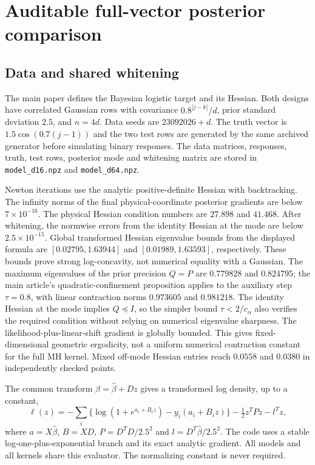 \documentclass[11pt]{article}
\theoremstyle{definition}\newtheorem{definition}[theorem]{Definition}
\theoremstyle{remark}\newtheorem{remark}[theorem]{Remark}
\numberwithin{equation}{section}
\newcommand{\1}{\mathbf 1}
\begin{document}
\section{Auditable full-vector posterior comparison}
\subsection{Data and shared whitening}
The main paper defines the Bayesian logistic target and its Hessian. Both designs have correlated Gaussian rows with covariance $0.8^{|j-k|}/d$, prior standard deviation $2.5$, and $n=4d$. Data seeds are $23092026+d$. The truth vector is $1.5\cos(0.7(j-1))$ and the two test rows are generated by the same archived generator before simulating binary responses. The data matrices, responses, truth, test rows, posterior mode and whitening matrix are stored in \texttt{model\_d16.npz} and \texttt{model\_d64.npz}.

Newton iterations use the analytic positive-definite Hessian with backtracking. The infinity norms of the final physical-coordinate posterior gradients are below $7\times10^{-16}$. The physical Hessian condition numbers are $27.898$ and $41.468$. After whitening, the normwise errors from the identity Hessian at the mode are below $2.5\times10^{-15}$. Global transformed Hessian eigenvalue bounds from the displayed formula are $[0.02795,1.63944]$ and $[0.01989,1.63593]$, respectively. These bounds prove strong log-concavity, not numerical equality with a Gaussian. The maximum eigenvalues of the prior precision $Q=P$ are $0.779828$ and $0.824795$; the main article's quadratic-confinement proposition applies to the auxiliary step $\tau=0.8$, with linear contraction norms $0.973605$ and $0.981218$. The identity Hessian at the mode implies $Q\preceq I$, so the simpler bound $\tau<2/c_\alpha$ also verifies the required condition without relying on numerical eigenvalue sharpness. The likelihood-plus-linear-shift gradient is globally bounded. This gives fixed-dimensional geometric ergodicity, not a uniform numerical contraction constant for the full MH kernel. Mixed off-mode Hessian entries reach $0.0558$ and $0.0380$ in independently checked points.

The common transform $\beta=\widehat\beta+Dz$ gives a transformed log density, up to a constant,
\[
 \ell(z)=-\sum_i\{\log(1+e^{a_i+B_iz})-y_i(a_i+B_iz)\}
 -\tfrac12 z^TPz-l^Tz,
\]
where $a=X\widehat\beta$, $B=XD$, $P=D^TD/2.5^2$ and $l=D^T\widehat\beta/2.5^2$. The code uses a stable log-one-plus-exponential branch and its exact analytic gradient. All models and all kernels share this evaluator. The normalizing constant is never required.
\end{document}
